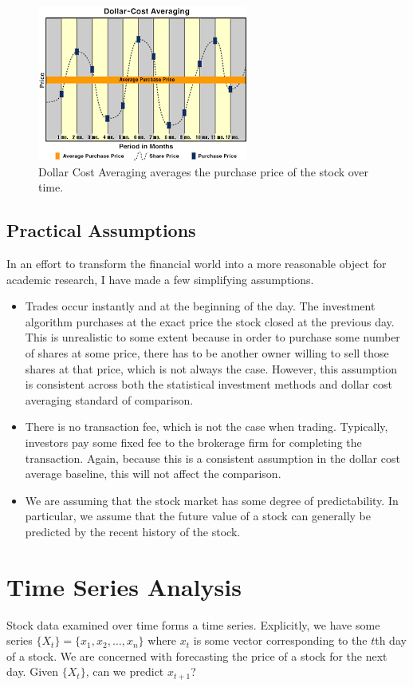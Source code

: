 \documentclass[12pt]{article}
\begin{document}
\begin{figure}[ht]
	\centering
	\includegraphics[width=.5\textwidth]{dca.png}
	\caption{Dollar Cost Averaging averages the purchase price of the stock over time. \cite{dca}}
	\label{dca}
\end{figure}

\subsection{Practical Assumptions}
In an effort to transform the financial world into a more reasonable object for academic research, I have made a few simplifying assumptions.
\begin{itemize}
	\item Trades occur instantly and at the beginning of the day. The investment algorithm purchases at the exact price the stock closed at the previous day. This is unrealistic to some extent because in order to purchase some number of shares at some price, there has to be another owner willing to sell those shares at that price, which is not always the case. However, this assumption is consistent across both the statistical investment methods and dollar cost averaging standard of comparison.
	
	\item There is no transaction fee, which is not the case when trading. Typically, investors pay some fixed fee to the brokerage firm for completing the transaction. Again, because this is a consistent assumption in the dollar cost average baseline, this will not affect the comparison.
			
			
	\item We are assuming that the stock market has some degree of predictability. In particular, we assume that the future value of a stock can generally be predicted by the recent history of the stock.
\end{itemize}
\section{Time Series Analysis}
Stock data examined over time forms a time series. Explicitly, we have some series $\{X_t\} = \{x_1, x_2, \dots, x_n\}$ where $x_t$ is some vector corresponding to the $t$th day of a stock. We are concerned with forecasting the price of a stock for the next day. Given $\{X_t\}$, can we predict $x_{t+1}$?
\end{document}
